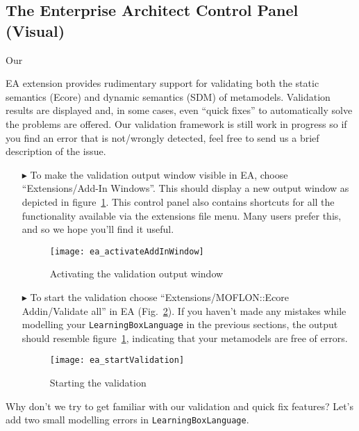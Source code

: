 \visHeader
\subsection{The Enterprise Architect Control Panel (Visual) }

\hypertarget{validation vis}{Our} EA extension provides rudimentary support for validating both the static semantics (Ecore) and dynamic semantics (SDM) of
metamodels. Validation results are displayed and, in some cases, even ``quick fixes'' to automatically solve the problems are offered. Our validation framework
is still work in progress so if you find an error that is not/wrongly detected, feel free to send us a brief description of the issue.

\begin{enumerate}
\item[$\blacktriangleright$] To make the validation output window visible in EA, choose ``Extensions/\-Add-In Windows''. This should display a new output window
as depicted in figure~\ref{fig:validation_output}. This control panel also contains shortcuts for all the functionality available via the extensions file menu.
Many users prefer this, and so we hope you'll find it useful.

\begin{figure}[htbp]
	\centering
  \texttt{[image: ea\_activateAddInWindow]}
	\caption{Activating the validation output window}
	\label{fig:validation_output}
\end{figure}
\FloatBarrier

\item[$\blacktriangleright$] To start the validation choose ``Extensions/\-MOFLON::Ecore Addin/\-Validate all'' in EA (Fig.~\ref{fig:validation_menu}).
If you haven't made any mistakes while modelling your \texttt{LearningBoxLanguage} in the previous sections, the output should resemble
figure~\ref{fig:validation_output}, indicating that your metamodels are free of errors.

\begin{figure}[htbp]
	\centering
  \texttt{[image: ea\_startValidation]}
	\caption{Starting the validation}
	\label{fig:validation_menu}
\end{figure}
\FloatBarrier
\end{enumerate}


Why don't we try to get familiar with our validation and quick fix features? Let's add two small modelling errors in \texttt{LearningBoxLanguage}.

